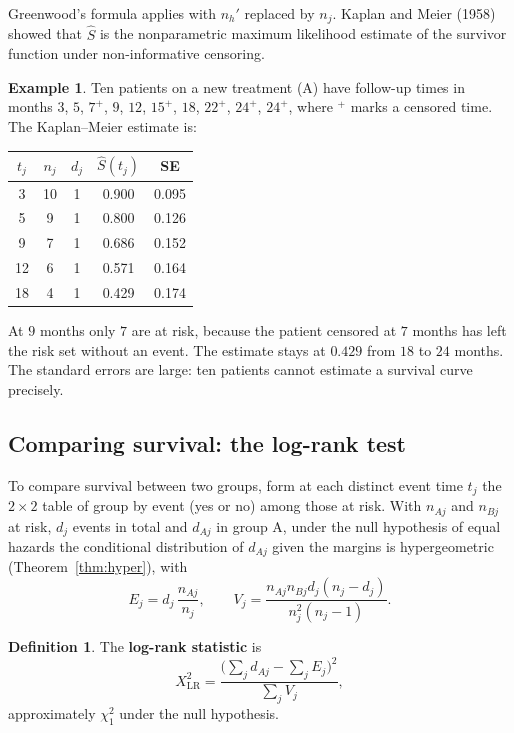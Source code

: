 \documentclass[11pt,a4paper]{article}
\numberwithin{equation}{section}
\theoremstyle{definition}
\newtheorem{defn}[thm]{Definition}
\newtheorem{exa}[thm]{Example}
\begin{document}
Greenwood's formula applies with $n_h'$ replaced by $n_j$. Kaplan and Meier (1958) showed that $\hat S$ is the nonparametric maximum likelihood
estimate of the survivor function under non-informative censoring.

\begin{exa}
\label{exa:km}
Ten patients on a new treatment (A) have follow-up times in months $3$, $5$, $7^+$, $9$, $12$, $15^+$, $18$, $22^+$, $24^+$, $24^+$, where $^+$ marks a censored time. The
Kaplan--Meier estimate is:
\begin{center}
\begin{tabular}{ccccc}
\hline
$t_j$ & $n_j$ & $d_j$ & $\hat S(t_j)$ & SE \\
\hline
3 & 10 & 1 & 0.900 & 0.095 \\
5 & 9 & 1 & 0.800 & 0.126 \\
9 & 7 & 1 & 0.686 & 0.152 \\
12 & 6 & 1 & 0.571 & 0.164 \\
18 & 4 & 1 & 0.429 & 0.174 \\
\hline
\end{tabular}
\end{center}
At $9$ months only $7$ are at risk, because the patient censored at $7$ months has left the risk set without an event. The estimate stays at $0.429$
from $18$ to $24$ months. The standard errors are large: ten patients cannot estimate a survival curve precisely.
\end{exa}

\subsection{Comparing survival: the log-rank test}

To compare survival between two groups, form at each distinct event time $t_j$ the $2 \times 2$ table of group by event (yes or no) among those
at risk. With $n_{Aj}$ and $n_{Bj}$ at risk, $d_j$ events in total and $d_{Aj}$ in group A, under the null hypothesis of equal hazards the conditional
distribution of $d_{Aj}$ given the margins is hypergeometric (Theorem~\ref{thm:hyper}), with
\[
E_j = d_j\,\frac{n_{Aj}}{n_j}, \qquad V_j = \frac{n_{Aj}n_{Bj}d_j(n_j - d_j)}{n_j^2(n_j - 1)} .
\]

\begin{defn}
The \textbf{log-rank statistic} is
\[
X^2_{\text{LR}} = \frac{\bigl(\sum_j d_{Aj} - \sum_j E_j\bigr)^2}{\sum_j V_j} ,
\]
approximately $\chi^2_1$ under the null hypothesis.
\end{defn}
\end{document}
